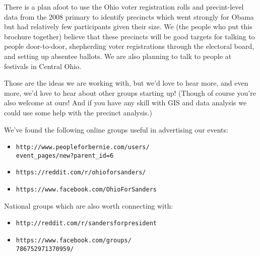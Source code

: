 \documentclass[notumble]{leaflet}
\begin{document}
There is a plan afoot to use the Ohio voter registration rolls and
precint-level data from the 2008 primary to identify precincts which
went strongly for Obama but had relatively few participants given
their size.  We (the people who put this brochure together) believe
that these precincts will be good targets for talking to people
door-to-door, shepherding voter registrations through the electoral
board, and setting up absentee ballots.  We are also planning to
talk to people at festivals in Central Ohio.  

Those are the ideas we are working with, but we'd love to hear more,
and even more, we'd love to hear about other groups starting up!
(Though of course you're also welcome at ours!  And if you have any
skill with GIS and data analysis we could use some help with the
precinct analysis.)

We've found the following online groups useful in advertising our
events:

\begin{itemize}

\item {\tt http://www.peopleforbernie.com/users/\\
  event\_pages/new?parent\_id=6}
\item {\tt https://reddit.com/r/ohioforsanders/}
\item {\tt https://www.facebook.com/OhioForSanders}

\end{itemize}

National groups which are also worth connecting with:

\begin{itemize}
\item {\tt http://reddit.com/r/sandersforpresident}
\item {\tt https://www.facebook.com/groups/\\
  786752971370959/}

\end{itemize}
\end{document}

